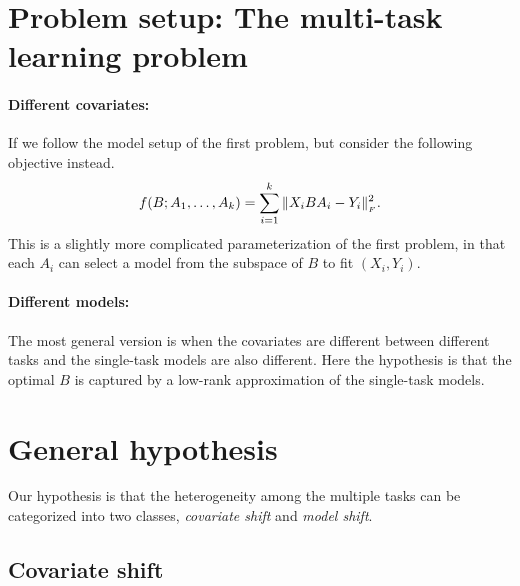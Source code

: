 \section{Problem setup: The multi-task learning problem}\label{sec_setup}


    \paragraph{Different covariates:}
    If we follow the model setup of the first problem, but consider the following objective instead.
    \begin{align}
        f(B; A_1, \dots, A_k) = \sum_{i=1}^k \|X_i B A_i - Y_i\|_{_{F}}^2.
    \end{align}
    This is a slightly more complicated parameterization of the first problem, in that each $A_i$ can select a model from the subspace of $B$ to fit $(X_i, Y_i)$.

    \paragraph{Different models:} The most general version is when the covariates are different between different tasks and the single-task models are also different.
    Here the hypothesis is that the optimal $B$ is captured by a low-rank approximation of the single-task models.

\section{General hypothesis}

Our hypothesis is that the heterogeneity among the multiple tasks can be categorized into two classes, \textit{covariate shift} and \textit{model shift}. 

\subsection{Covariate shift}

